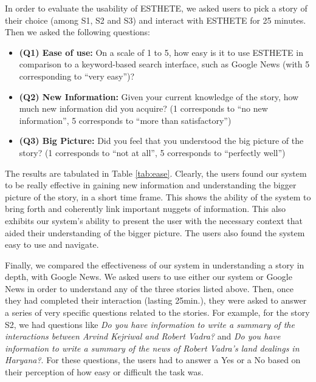 \normalsize
In order to evaluate the usability of ESTHETE, we asked users to pick a story of their choice (among S1, S2 and S3) and interact with ESTHETE for 25 minutes. Then we asked the following questions:

\begin{itemize}
	\item {\bf (Q1) Ease of use:} On a scale of 1 to 5, how easy is it to use ESTHETE in comparison to a keyword-based search interface, such as Google News (with 5 corresponding to ``very easy'')?
	\item {\bf (Q2) New Information:} Given your current knowledge of the story, how much new information did you acquire? (1 corresponds to ``no new information'', 5 corresponds to ``more than satisfactory'')
	\item {\bf (Q3) Big Picture:} Did you feel that you understood the big picture of the story? (1 corresponds to ``not at all'', 5 corresponds to ``perfectly well'')
\end{itemize}

The results are tabulated in Table \ref{tab:ease}.
Clearly, the users found our system to be really effective in gaining new information and understanding the bigger picture of the story, in a short time frame. This shows the ability of the system to bring forth and coherently link important nuggets of information. This also exhibits our system's ability to present the user with the necessary context that aided their understanding of the bigger picture. The users also found the system easy to use and navigate. %


Finally, we compared the effectiveness of our system in understanding a story in depth, with Google News. We asked users to use either our system or Google News in order to understand any of the three stories listed above. Then, once they had completed their interaction (lasting 25min.), they were asked to answer a series of very specific questions related to the stories. For example, for the story S2, we had questions like \emph{Do you have information to write a summary of the interactions between Arvind Kejriwal and Robert Vadra?} and \emph{Do you have information to write a summary of the news of Robert Vadra's land dealings in Haryana?}. For these questions, the users had to answer a Yes or a No based on their perception of how easy or difficult the task was. 

